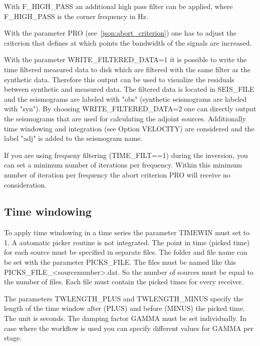 With F\_HIGH\_PASS an additional high pass filter can be applied, where F\_HIGH\_PASS is the corner frequency in Hz.

With the parameter PRO (see~\ref{json:abort_criterion}) one has to adjust the criterion that defines at which points the bandwidth of the signals are increased.

With the parameter WRITE\_FILTERED\_DATA=1 it is possible to write the time filtered measured data to disk which are filtered with the same filter as the synthetic data. Therefore this output can be used to visualize the residuals between synthetic and measured data. The filtered data is located in SEIS\_FILE and the seismograms are labeled with "obs" (synthetic seismograms are labeled with "syn"). By choosing WRITE\_FILTERED\_DATA=2 one can directly output the seismograms that are used for calculating the adjoint sources. Additionally time windowing and integration (see Option VELOCITY) are considered and the label "adj" is added to the seismogram name.

If you are using frequeny filtering (TIME\_FILT==1) during the inversion, you can set a minimum number of iterations per frequency. Within this minimum number of iteration per frequency the abort criterion PRO will receive no consideration.

\subsection{Time windowing}
{\color{blue}{\begin{verbatim}
"Time windowing" : "comment",
			"TIMEWIN" : "0",
			"TW_IND" : "0",
			"PICKS_FILE" : "./picked_times/picks"
			"TWLENGTH_PLUS" : "0.01",
			"TWLENGTH_MINUS" : "0.01",
			"GAMMA" : "30",
\end{verbatim}}}

{\color{red}{\begin{verbatim}
Default values are:
	TIMEWIN=0
\end{verbatim}}}

To apply time windowing in a time series the parameter TIMEWIN must set to 1. A automatic picker routine is not integrated. The point in time (picked time) for each source must be specified in separate files. The folder and file name can be set with the parameter PICKS\_FILE. The files must be named like this PICKS\_FILE\_<sourcenumber>.dat. So the number of sources must be equal to the number of files. Each file must contain the picked times for every receiver.

The parameters TWLENGTH\_PLUS and TWLENGTH\_MINUS specify the length of the time window after (PLUS) and before (MINUS) the picked time. The unit is seconds. The damping factor GAMMA must be set individually. In case where the workflow is used you can specify different values for GAMMA per stage.

